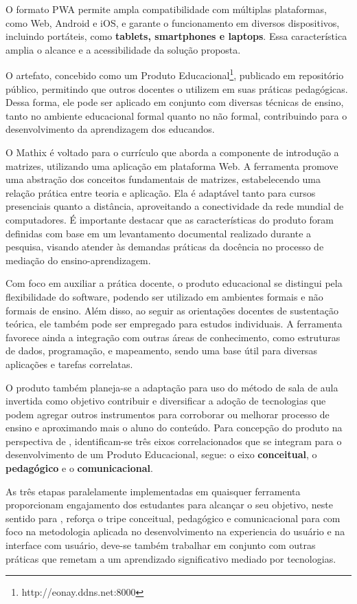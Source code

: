 O formato PWA permite ampla compatibilidade com múltiplas plataformas, como Web, Android e iOS, e garante o funcionamento em diversos dispositivos, incluindo portáteis, como \textbf{tablets, smartphones e laptops}. Essa característica amplia o alcance e a acessibilidade da solução proposta.

O artefato, concebido como um Produto Educacional\footnote{http://eonay.ddns.net:8000}, publicado em repositório público, permitindo que outros docentes o utilizem em suas práticas pedagógicas. Dessa forma, ele pode ser aplicado em conjunto com diversas técnicas de ensino, tanto no ambiente educacional formal quanto no não formal, contribuindo para o desenvolvimento da aprendizagem dos educandos.

O Mathix é voltado para o currículo que aborda a componente de introdução a matrizes, utilizando uma aplicação em plataforma Web. A ferramenta promove uma abstração dos conceitos fundamentais de matrizes, estabelecendo uma relação prática entre teoria e aplicação. Ela é adaptável tanto para cursos presenciais quanto a distância, aproveitando a conectividade da rede mundial de computadores. É importante destacar que as características do produto foram definidas com base em um levantamento documental realizado durante a pesquisa, visando atender às demandas práticas da docência no processo de mediação do ensino-aprendizagem.

Com foco em auxiliar a prática docente, o produto educacional se distingui pela flexibilidade do software, podendo ser utilizado em ambientes formais e não formais de ensino. Além disso, ao seguir as orientações docentes de sustentação teórica, ele também pode ser empregado para estudos individuais. A ferramenta favorece ainda a integração com outras áreas de conhecimento, como estruturas de dados, programação, e mapeamento, sendo uma base útil para diversas aplicações e tarefas correlatas.


O produto também planeja-se a adaptação para uso do método de sala de aula invertida como objetivo contribuir e diversificar a adoção de tecnologias que podem agregar outros instrumentos para corroborar ou melhorar processo de ensino e aproximando mais o aluno do conteúdo. Para concepção do produto na perspectiva de , identificam-se três eixos correlacionados que se integram para o desenvolvimento de um Produto Educacional, segue: o eixo \textbf{conceitual}, o \textbf{pedagógico} e o \textbf{comunicacional}.


As três etapas paralelamente implementadas em quaisquer ferramenta proporcionam engajamento dos estudantes para alcançar o seu objetivo, neste sentido para , reforça o tripe conceitual, pedagógico e comunicacional para com  foco na metodologia aplicada no desenvolvimento na experiencia do usuário e na interface com usuário, deve-se também trabalhar em conjunto com outras práticas que remetam a um aprendizado significativo mediado por tecnologias.



